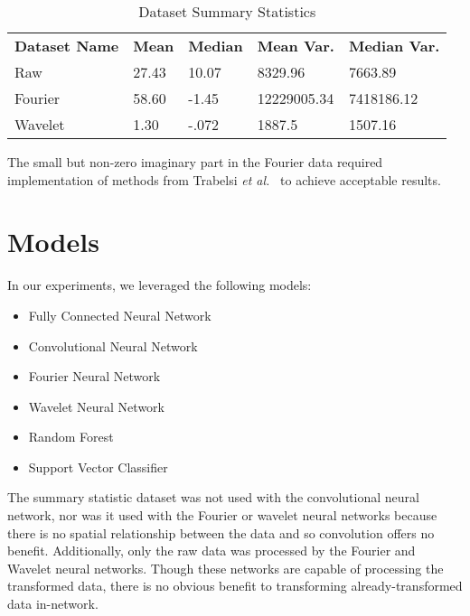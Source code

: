 \renewcommand{\thefootnote}{*} 
\begin{table}[h]
\centering
\begin{tabular}{l|llll}
\textbf{Dataset Name} & \textbf{Mean} & \textbf{Median} & \textbf{Mean Var.} & \textbf{Median Var.} \\\cline{1-5}
Raw         & 27.43    & 10.07    & 8329.96    & 7663.89 \\
Fourier       & 58.60\footnotemark    & -1.45    & 12229005.34    & 7418186.12 \\
Wavelet        & 1.30    & -.072    & 1887.5    & 1507.16 \\             
\end{tabular}
\caption{Dataset Summary Statistics}
\label{Tab:summary}
\end{table}

\renewcommand{\thefootnote}{1}
The small but non-zero imaginary part in the Fourier data required implementation of methods from Trabelsi \textit{et al.}~\cite{trabelsi2017deep} to achieve acceptable results.

\section{Models}\label{model_descriptions}
In our experiments, we leveraged the following models:
\begin{itemize}
\item Fully Connected Neural Network
\item Convolutional Neural Network
\item Fourier Neural Network
\item Wavelet Neural Network
\item Random Forest
\item Support Vector Classifier	
\end{itemize}

The summary statistic dataset was not used with the convolutional neural network, nor was it used with the Fourier or wavelet neural networks because there is no spatial relationship between the data and so convolution offers no benefit.
Additionally, only the raw data was processed by the Fourier and Wavelet neural networks.
Though these networks are capable of processing the transformed data, there is no obvious benefit to transforming already-transformed data in-network.


